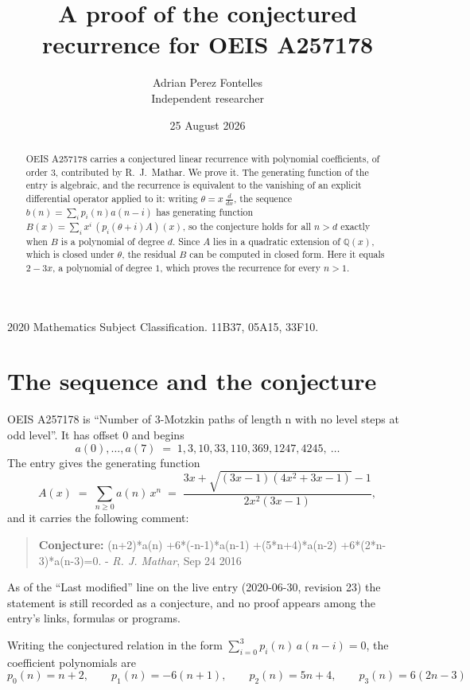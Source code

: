 \documentclass[11pt,a4paper]{article}
\title{A proof of the conjectured recurrence for OEIS A257178}
\author{Adrian Perez Fontelles\\ \small Independent researcher}
\date{25 August 2026}
\theoremstyle{plain}
\theoremstyle{definition}
\begin{document}
\maketitle

\begin{abstract}
OEIS A257178 carries a conjectured linear recurrence with polynomial coefficients, of
order 3, contributed by R.~J.~Mathar. We prove it. The generating function of the
entry is algebraic, and the recurrence is equivalent to the vanishing of an explicit
differential operator applied to it: writing $\theta=x\,\frac{d}{dx}$, the sequence
$b(n)=\sum_{i}p_{i}(n)a(n-i)$ has generating function
$B(x)=\sum_{i}x^{i}\,(p_{i}(\theta+i)A)(x)$, so the conjecture holds for all $n>d$ exactly
when $B$ is a polynomial of degree $d$. Since $A$ lies in a quadratic extension of
$\mathbb{Q}(x)$, which is closed under $\theta$, the residual $B$ can be computed in
closed form. Here it equals $2 - 3 x$, a polynomial of degree $1$, which proves
the recurrence for every $n>1$.
\end{abstract}

\noindent\small 2020 Mathematics Subject Classification. 11B37, 05A15, 33F10.\normalsize

\section{The sequence and the conjecture}

OEIS A257178 is ``Number of 3-Motzkin paths of length n with no level steps at odd level''. It has offset $0$ and begins
\[
a(0),\dots,a(7)\;=\;1, 3, 10, 33, 110, 369, 1247, 4245,\ \dots
\]
The entry gives the generating function
\begin{equation}\label{eq:gf}
A(x)\;=\;\sum_{n\ge 0} a(n)\,x^{n}\;=\;\frac{3 x + \sqrt{\left(3 x - 1\right) \left(4 x^{2} + 3 x - 1\right)} - 1}{2 x^{2} \left(3 x - 1\right)} ,
\end{equation}
and it carries the following comment:
\begin{quote}\small
\textbf{Conjecture:} (n+2)*a(n) +6*(-n-1)*a(n-1) +(5*n+4)*a(n-2) +6*(2*n-3)*a(n-3)=0. - \emph{R. J. Mathar}, Sep 24 2016
\end{quote}
As of the ``Last modified'' line on the live entry (2020-06-30, revision 23) the
statement is still recorded as a conjecture, and no proof appears among the entry's links,
formulas or programs.

Writing the conjectured relation in the form $\sum_{i=0}^{3}p_{i}(n)\,a(n-i)=0$,
the coefficient polynomials are
\[
p_{0}(n)=n + 2,\qquad p_{1}(n)=- 6 \left(n + 1\right),\qquad p_{2}(n)=5 n + 4,\qquad p_{3}(n)=6 \left(2 n - 3\right)
\]
\end{document}
